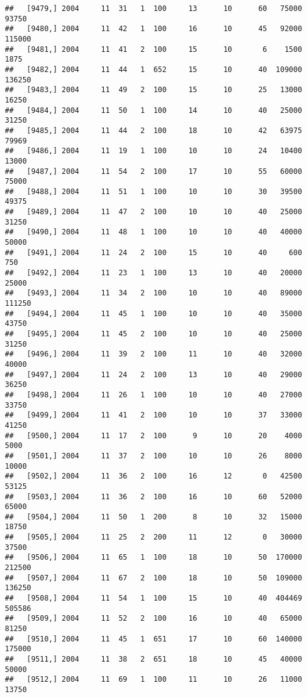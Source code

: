 \documentclass{article}\usepackage[]{graphicx}\usepackage[]{color}
\makeatletter
\newenvironment{kframe}{%
 \def\at@end@of@kframe{}%
 \ifinner\ifhmode%
  \def\at@end@of@kframe{\end{minipage}}%
  \begin{minipage}{\columnwidth}%
 \fi\fi%
 \def\FrameCommand##1{\hskip\@totalleftmargin \hskip-\fboxsep
 \colorbox{shadecolor}{##1}\hskip-\fboxsep
     \hskip-\linewidth \hskip-\@totalleftmargin \hskip\columnwidth}%
 \MakeFramed {\advance\hsize-\width
   \@totalleftmargin\z@ \linewidth\hsize
   \@setminipage}}%
 {\par\unskip\endMakeFramed%
 \at@end@of@kframe}
\newenvironment{knitrout}{}{} %
\makeatother
\begin{document}
\begin{knitrout}
\begin{kframe}
\begin{verbatim}
##   [9479,] 2004     11  31   1  100     13      10      60   75000   93750
##   [9480,] 2004     11  42   1  100     16      10      45   92000  115000
##   [9481,] 2004     11  41   2  100     15      10       6    1500    1875
##   [9482,] 2004     11  44   1  652     15      10      40  109000  136250
##   [9483,] 2004     11  49   2  100     15      10      25   13000   16250
##   [9484,] 2004     11  50   1  100     14      10      40   25000   31250
##   [9485,] 2004     11  44   2  100     18      10      42   63975   79969
##   [9486,] 2004     11  19   1  100     10      10      24   10400   13000
##   [9487,] 2004     11  54   2  100     17      10      55   60000   75000
##   [9488,] 2004     11  51   1  100     10      10      30   39500   49375
##   [9489,] 2004     11  47   2  100     10      10      40   25000   31250
##   [9490,] 2004     11  48   1  100     10      10      40   40000   50000
##   [9491,] 2004     11  24   2  100     15      10      40     600     750
##   [9492,] 2004     11  23   1  100     13      10      40   20000   25000
##   [9493,] 2004     11  34   2  100     10      10      40   89000  111250
##   [9494,] 2004     11  45   1  100     10      10      40   35000   43750
##   [9495,] 2004     11  45   2  100     10      10      40   25000   31250
##   [9496,] 2004     11  39   2  100     11      10      40   32000   40000
##   [9497,] 2004     11  24   2  100     13      10      40   29000   36250
##   [9498,] 2004     11  26   1  100     10      10      40   27000   33750
##   [9499,] 2004     11  41   2  100     10      10      37   33000   41250
##   [9500,] 2004     11  17   2  100      9      10      20    4000    5000
##   [9501,] 2004     11  37   2  100     10      10      26    8000   10000
##   [9502,] 2004     11  36   2  100     16      12       0   42500   53125
##   [9503,] 2004     11  36   2  100     16      10      60   52000   65000
##   [9504,] 2004     11  50   1  200      8      10      32   15000   18750
##   [9505,] 2004     11  25   2  200     11      12       0   30000   37500
##   [9506,] 2004     11  65   1  100     18      10      50  170000  212500
##   [9507,] 2004     11  67   2  100     18      10      50  109000  136250
##   [9508,] 2004     11  54   1  100     15      10      40  404469  505586
##   [9509,] 2004     11  52   2  100     16      10      40   65000   81250
##   [9510,] 2004     11  45   1  651     17      10      60  140000  175000
##   [9511,] 2004     11  38   2  651     18      10      45   40000   50000
##   [9512,] 2004     11  69   1  100     11      10      26   11000   13750

\end{verbatim}
\end{kframe}
\end{knitrout}
\end{document}
